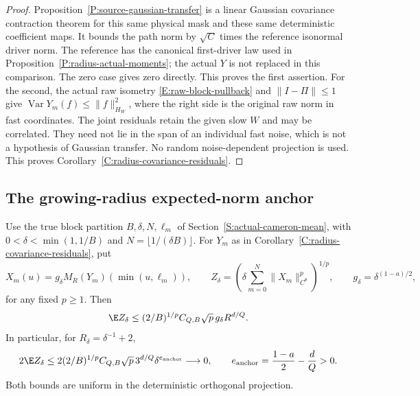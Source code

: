 \begin{proof}
  Proposition~\ref{P:source-gaussian-transfer} is a linear Gaussian
  covariance contraction theorem for this same physical mask and
  these same deterministic coefficient maps.
  It bounds the path norm by $\sqrt C$ times the reference
  isonormal driver norm. The reference has the canonical first-driver
  law used in Proposition~\ref{P:radius-actual-moments}; the actual
  $Y$ is not replaced in this comparison. The zero case gives zero
  directly. This proves the first assertion.
  For the second, the actual raw isometry
  \eqref{E:raw-block-pullback} and $\|I-\Pi\|\le1$ give
  $\operatorname{Var}Y_m(f)\le\|f\|_{H_W}^2$,
  where the right side is the original raw norm in fast coordinates.
  The joint residuals retain the given slow $W$ and may be correlated.
  They need not lie in the span of an individual fast noise,
  which is not a hypothesis of Gaussian transfer.
  No random noise-dependent projection is used.
  This proves Corollary~\ref{C:radius-covariance-residuals}.
\end{proof}

\subsection{The growing-radius expected-norm anchor}

\begin{proposition}
  \label{P:radius-mean-anchor}
  Use the true block partition $B,\delta,N,\ell_m$ of
  Section~\ref{S:actual-cameron-mean}, with
  $0<\delta<\min(1,1/B)$ and $N=\lfloor1/(\delta B)\rfloor$.
  For $Y_m$ as in Corollary~\ref{C:radius-covariance-residuals},
  put
  \[
    X_m(u)=g_\delta M_R(Y_m)(\min(u,\ell_m)),\qquad
    Z_\delta=\left(\delta\sum_{m=0}^N
    \|X_m\|_{C^\theta}^p\right)^{1/p},\qquad
    g_\delta=\delta^{(1-a)/2},
  \]
  for any fixed $p\ge1$. Then
  \begin{equation}\label{E:radius-mean-anchor}
    \E Z_\delta\le(2/B)^{1/p}C_{Q,B}\sqrt p\,
    g_\delta R^{d/Q}.
  \end{equation}
  In particular, for $R_\delta=\delta^{-1}+2$,
  \begin{equation}\label{E:radius-mean-anchor-decay}
    2\E Z_\delta
    \le2(2/B)^{1/p}C_{Q,B}\sqrt p\,3^{d/Q}
    \delta^{e_{\rm anchor}}\longrightarrow0,\qquad
    e_{\rm anchor}=\frac{1-a}{2}-\frac dQ>0 .
  \end{equation}
  Both bounds are uniform in the deterministic orthogonal projection.
\end{proposition}

